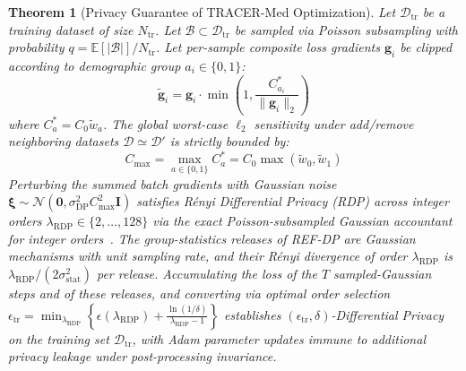 \documentclass[3p,12pt]{elsarticle}
\theoremstyle{plain}
\newtheorem{theorem}{Theorem}
\theoremstyle{definition}
\begin{document}
\begin{theorem}[Privacy Guarantee of TRACER-Med Optimization]
\label{thm:privacy}
Let $\mathcal{D}_{\text{tr}}$ be a training dataset of size $N_{\text{tr}}$. Let $\mathcal{B} \subset \mathcal{D}_{\text{tr}}$ be sampled via Poisson subsampling with probability $q = \mathbb{E}[|\mathcal{B}|]/N_{\text{tr}}$. Let per-sample composite loss gradients $\mathbf{g}_i$ be clipped according to demographic group $a_i \in \{0, 1\}$:
\begin{equation}
    \tilde{\mathbf{g}}_i = \mathbf{g}_i \cdot \min\left(1, \frac{C_{a_i}^*}{\|\mathbf{g}_i\|_2}\right)
\end{equation}
where $C_a^* = C_0 \tilde{w}_a$. The global worst-case $\ell_2$ sensitivity under add/remove neighboring datasets $\mathcal{D} \simeq \mathcal{D}'$ is strictly bounded by:
\begin{equation}
    C_{\max} = \max_{a \in \{0, 1\}} C_a^* = C_0 \max(\tilde{w}_0, \tilde{w}_1)
\end{equation}
Perturbing the summed batch gradients with Gaussian noise $\boldsymbol{\xi} \sim \mathcal{N}\left(\mathbf{0}, \sigma_{\text{DP}}^2 C_{\max}^2 \mathbf{I}\right)$ satisfies Rényi Differential Privacy (RDP) across integer orders $\lambda_{\text{RDP}} \in \{2,\dots,128\}$ via the exact Poisson-subsampled Gaussian accountant for integer orders~\cite{mironov2019renyi}. The group-statistics releases of REF-DP are Gaussian mechanisms with unit sampling rate, and their R\'enyi divergence of order $\lambda_{\text{RDP}}$ is $\lambda_{\text{RDP}}/(2\sigma_{\text{stat}}^2)$ per release. Accumulating the loss of the $T$ sampled-Gaussian steps and of these releases, and converting via optimal order selection $\epsilon_{\text{tr}} = \min_{\lambda_{\text{RDP}}} \left\{ \epsilon(\lambda_{\text{RDP}}) + \frac{\ln(1/\delta)}{\lambda_{\text{RDP}} - 1} \right\}$ establishes $(\epsilon_{\text{tr}}, \delta)$-Differential Privacy on the training set $\mathcal{D}_{\text{tr}}$, with Adam parameter updates immune to additional privacy leakage under post-processing invariance.
\end{theorem}
\end{document}
